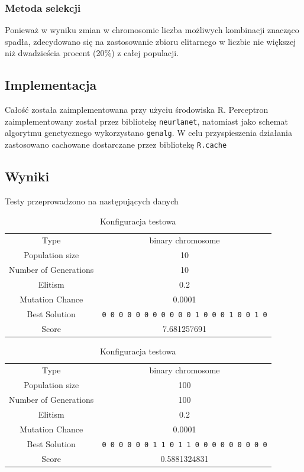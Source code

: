\documentclass{llncs}
\begin{document}
\subsubsection{Metoda selekcji}
Ponieważ w wyniku zmian w chromosomie liczba możliwych kombinacji znacząco spadła, zdecydowano się na 
zastosowanie zbioru elitarnego w liczbie nie większej niż dwadzieścia procent (20\%) z całej populacji.

\subsection{Implementacja}
Całość została zaimplementowana przy użyciu środowiska R. Perceptron zaimplementowany został
przez bibliotekę \texttt{neurlanet}\cite{R:neuralnet}, natomiast jako schemat algorytmu genetycznego wykorzystano
\texttt{genalg}\cite{R:genalg}. W celu przyspieszenia działania zastosowano cachowane dostarczane przez bibliotekę
\texttt{R.cache}\cite{R:cache}

\subsection{Wyniki}
Testy przeprowadzono na następujących danych

\begin{table}[H]
\caption{Konfiguracja testowa}
\label{small}
\centering
\begin{tabular}{|c|c|}
  Type                  & binary chromosome \\
  Population size       & 10 \\
  Number of Generations & 10 \\
  Elitism               & 0.2 \\
  Mutation Chance       & 0.0001 \\
  Best Solution & \texttt{0 0 0 0 0 0 0 0 0 0 0 1 0 0 0 1 0 0 1 0} \\
  Score & 7.681257691 \\
\end{tabular} 

\end{table}

\begin{table}[H]
\caption{Konfiguracja testowa}
\label{mid}
\centering
\begin{tabular}{|c|c|}
  Type                  & binary chromosome \\
  Population size       & 100 \\
  Number of Generations & 100 \\
  Elitism               & 0.2 \\
  Mutation Chance       & 0.0001 \\
  Best Solution & \texttt{0 0 0 0 0 0 1 1 0 1 1 0 0 0 0 0 0 0 0 0} \\
  Score & 0.5881324831 \\
\end{tabular} 

\end{table}
\end{document}
